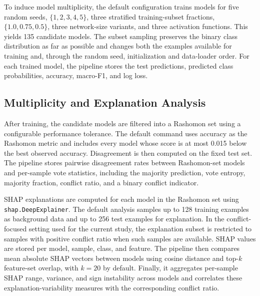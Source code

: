 To induce model multiplicity, the default configuration trains models for five random seeds, $\{1,2,3,4,5\}$, three stratified training-subset fractions, $\{1.0,0.75,0.5\}$, three network-size variants, and three activation functions. This yields 135 candidate models. The subset sampling preserves the binary class distribution as far as possible and changes both the examples available for training and, through the random seed, initialization and data-loader order. For each trained model, the pipeline stores the test predictions, predicted class probabilities, accuracy, macro-\gls{F1}, and log loss.

\subsection{Multiplicity and Explanation Analysis}

After training, the candidate models are filtered into a Rashomon set using a configurable performance tolerance. The default command uses accuracy as the Rashomon metric and includes every model whose score is at most 0.015 below the best observed accuracy. Disagreement is then computed on the fixed test set. The pipeline stores pairwise disagreement rates between Rashomon-set models and per-sample vote statistics, including the majority prediction, vote entropy, majority fraction, conflict ratio, and a binary conflict indicator.

\gls{SHAP} explanations are computed for each model in the Rashomon set using \texttt{shap.DeepExplainer}. The default analysis samples up to 128 training examples as background data and up to 256 test examples for explanation. In the conflict-focused setting used for the current study, the explanation subset is restricted to samples with positive conflict ratio when such samples are available. \gls{SHAP} values are stored per model, sample, class, and feature. The pipeline then compares mean absolute \gls{SHAP} vectors between models using cosine distance and top-\(k\) feature-set overlap, with \(k=20\) by default. Finally, it aggregates per-sample \gls{SHAP} range, variance, and sign instability across models and correlates these explanation-variability measures with the corresponding conflict ratio.
